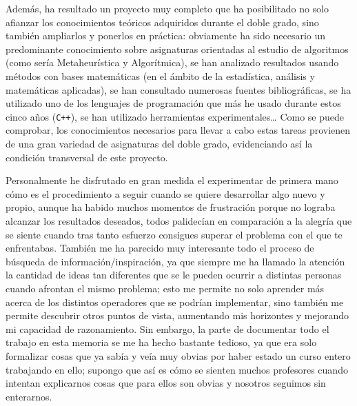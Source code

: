 Además, ha resultado un proyecto muy completo que ha posibilitado no solo afianzar los conocimientos teóricos adquiridos durante el doble grado, sino también ampliarlos y ponerlos en práctica: 
obviamente ha sido necesario un predominante conocimiento sobre asignaturas orientadas al estudio de algoritmos (como sería Metaheurística y Algorítmica), se han analizado resultados usando métodos con bases matemáticas (en el ámbito de la estadística, análisis y matemáticas aplicadas), se han consultado numerosas fuentes bibliográficas, se ha utilizado uno de los lenguajes de programación que más he usado durante estos cinco años (\texttt{C++}), se han utilizado herramientas experimentales\dots 
Como se puede comprobar, los conocimientos necesarios para llevar a cabo estas tareas provienen de una gran variedad de asignaturas del doble grado, evidenciando así la condición transversal de este proyecto. 

Personalmente he disfrutado en gran medida el experimentar de primera mano cómo es el procedimiento a seguir cuando se quiere desarrollar algo nuevo y propio, aunque ha habido muchos momentos de frustración porque no lograba alcanzar los resultados deseados, todos palidecían en comparación a la alegría que se siente cuando tras tanto esfuerzo consigues superar el problema con el que te enfrentabas. 
También me ha parecido muy interesante todo el proceso de búsqueda de información/inspiración, ya que siempre me ha llamado la atención la cantidad de ideas tan diferentes que se le pueden ocurrir a distintas personas cuando afrontan el mismo problema; esto me permite no solo aprender más acerca de los distintos operadores que se podrían implementar, sino también me permite descubrir otros puntos de vista, aumentando mis horizontes y mejorando mi capacidad de razonamiento. 
Sin embargo, la parte de documentar todo el trabajo en esta memoria se me ha hecho bastante tedioso, ya que era solo formalizar cosas que ya sabía y veía muy obvias por haber estado un curso entero trabajando en ello; supongo que así es cómo se sienten muchos profesores cuando intentan explicarnos cosas que para ellos son obvias y nosotros seguimos sin enterarnos. 


